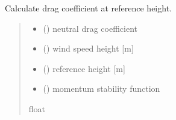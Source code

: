 \documentclass[letterpaper,10pt,english]{sphinxmanual}
\begin{document}
\begin{fulllineitems}
\label{\detokenize{users_guide:AirSeaFluxCode.flux_subs.drag_coef.cd_calc}}
\pysigstartsignatures
\pysiglinewithargsret
{}
{\sphinxparamcomma {}\sphinxparamcomma {}\sphinxparamcomma {}}
{}
\pysigstopsignatures
\sphinxAtStartPar
Calculate drag coefficient at reference height.
\begin{quote}\begin{description}
\begin{itemize}
\item {}
\sphinxAtStartPar
{} () \textendash{} neutral drag coefficient

\item {}
\sphinxAtStartPar
{} () \textendash{} wind speed height       {[}m{]}

\item {}
\sphinxAtStartPar
{} () \textendash{} reference height        {[}m{]}

\item {}
\sphinxAtStartPar
{} () \textendash{} momentum stability function

\end{itemize}

\sphinxAtStartPar
{}

\sphinxAtStartPar
float

\end{description}\end{quote}

\end{fulllineitems}

\end{document}
